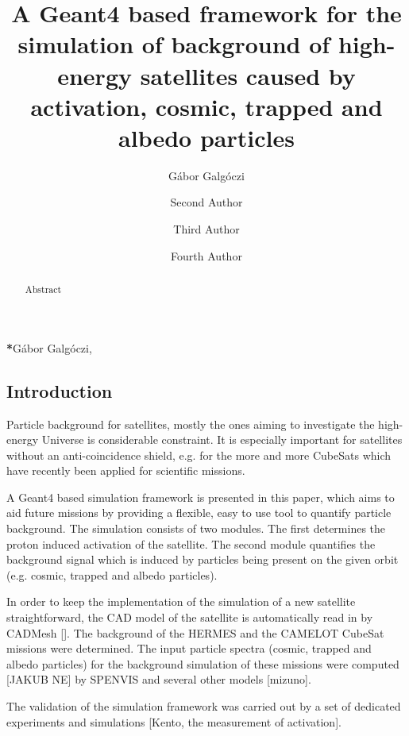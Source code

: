 \documentclass[12pt]{spieman}  %
\title{A Geant4 based framework for the simulation of background of high-energy satellites caused by activation, cosmic, trapped and albedo particles}
\author[a,*]{G\'abor Galg\'oczi}
\author[a]{Second Author}
\author[b]{Third Author}
\author[a,b]{Fourth Author}
\affil[a]{University Name, Faculty Group, Department, Street Address, City, Country, Postal Code}
\affil[b]{Company Name, Street Address, City, Country, Postal Code}
\begin{document}
 
\maketitle

\begin{abstract}
Abstract
\end{abstract}


{\noindent \footnotesize\textbf{*}G\'abor Galg\'oczi,   }

\begin{spacing}{2}   %

\section{Introduction}
\label{sect:intro}  %

Particle background for satellites, mostly the ones aiming to investigate the high-energy Universe is considerable constraint. It is especially important for satellites without an anti-coincidence shield, e.g. for the more and more CubeSats which have recently been applied for scientific missions. 

A Geant4 based simulation framework is presented in this paper, which aims to aid future missions by providing a flexible, easy to use tool to quantify particle background. The simulation consists of two modules. The first determines the proton induced activation of the satellite. The second module quantifies the background signal which is induced by particles being present on the given orbit (e.g. cosmic, trapped and albedo particles). 

In order to keep the implementation of the simulation of a new satellite straightforward, the CAD model of the satellite is automatically read in by CADMesh []. The background of the HERMES and the CAMELOT CubeSat missions were determined. The input particle spectra (cosmic, trapped and albedo particles) for the background simulation of these missions were computed [JAKUB NE] by SPENVIS and several other models [mizuno].

The validation of the simulation framework was carried out by a set of dedicated experiments and simulations [Kento, the measurement of activation].


\end{spacing}
\end{document}
